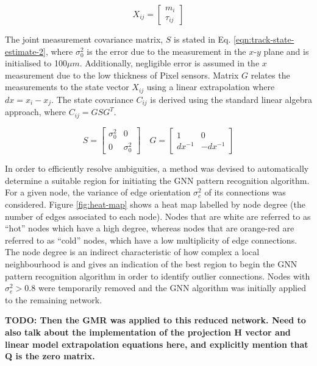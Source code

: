 \begin{equation}
X_{ij} = \begin{bmatrix} m_i \\ \tau_{ij} \end{bmatrix}
\label{eqn:track-state-estimate}
\end{equation}

The joint measurement covariance matrix, $S$ is stated in Eq. \eqref{eqn:track-state-estimate-2}, where $\sigma_0^{2}$ is the error due to the measurement in the $x$-$y$ plane and is initialised to 100$\mu m$. Additionally, negligible error is assumed in the $x$ measurement due to the low thickness of Pixel sensors. Matrix $G$ relates the measurements to the state vector $X_{ij}$ using a linear extrapolation where $dx = x_i - x_j$. The state covariance $C_{ij}$ is derived using the standard linear algebra approach, where $C_{ij} = GSG^T$. 

\begin{equation}
S = \begin{bmatrix} \sigma_0^{2} & 0 \\ 0 & \sigma_0^{2} \end{bmatrix}  \quad G = \begin{bmatrix} 1 & 0 \\ dx^{-1} & -dx^{-1}  \end{bmatrix}
\label{eqn:track-state-estimate-2}
\end{equation}


In order to efficiently resolve ambiguities, a method was devised to automatically determine a suitable region for initiating the GNN pattern recognition algorithm. For a given node, the variance of edge orientation $\sigma_e^2$ of its connections was considered. Figure \ref{fig:heat-map} shows a heat map labelled by node degree (the number of edges associated to each node). Nodes that are white are referred to as ``hot'' nodes which have a high degree, whereas nodes that are orange-red are referred to as ``cold'' nodes, which have a low multiplicity of edge connections. The node degree is an indirect characteristic of how complex a local neighbourhood is and gives an indication of the best region to begin the GNN pattern recognition algorithm in order to identify outlier connections. Nodes with $\sigma_e^2 > 0.8$ were temporarily removed and the GNN algorithm was initially applied to the remaining network.

\textbf{TODO: Then the GMR was applied to this reduced network. Need to also talk about the implementation of the projection H vector and linear model extrapolation equations here, and explicitly mention that Q is the zero matrix.}

